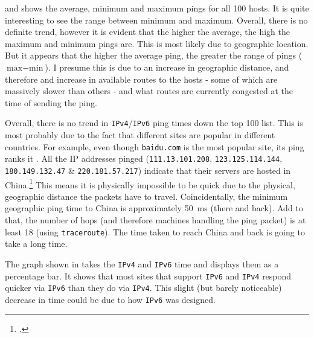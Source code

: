 \documentclass[a4paper]{article}
\def \IPF {\texttt{IPv4}}
\def \IPS {\texttt{IPv6}}
\begin{document}
 and  shows the average, minimum and maximum pings for all 100 hosts.
It is quite interesting to see the range between minimum and maximum.
Overall, there is no definite trend, however it is evident that the higher the average, the high the maximum and minimum pings are.
This is most likely due to geographic location.
But it appears that the higher the average ping, the greater the range of pings ($ \textrm{max} - \textrm{min}$).
I presume this is due to an increase in geographic distance, and therefore and increase in available routes to the hosts -
  some of which are massively slower than others - and what routes are currently congested at the time of sending the ping.

Overall, there is no trend in {\IPF}/{\IPS} ping times down the top 100 list.
This is most probably due to the fact that different sites are popular in different countries.
For example, even though \texttt{baidu.com} is the  most popular site, its ping ranks it .
All the IP addresses pinged (\texttt{111.13.101.208}, \texttt{123.125.114.144}, \texttt{180.149.132.47} \& \texttt{220.181.57.217})
  indicate that their servers are hosted in China.\footcite{ip_location}
This means it is physically impossible to be quick due to the physical, geographic distance the packets have to travel.
Coincidentally, the minimum geographic ping time to China is approximately \SI{50}{\milli\second} (there and back).
Add to that, the number of hops (and therefore machines handling the ping packet) is at least 18 (using \texttt{traceroute}).
The time taken to reach China and back is going to take a long time.

The graph shown in  takes the {\IPF} and {\IPS} time and displays them as a percentage bar.
It shows that most sites that support {\IPS} and {\IPF} respond quicker via {\IPS} than they do via {\IPF}.
This slight (but barely noticeable) decrease in time could be due to how {\IPS} was designed.

\newpage
\printbibliography
\end{document}
